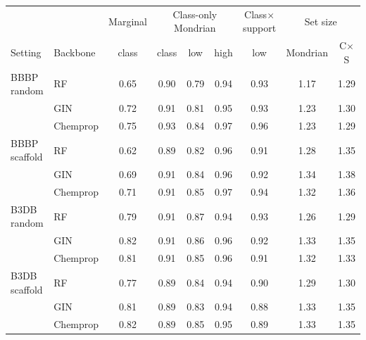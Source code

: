 \begin{tabular}{llccccccc}
\toprule
& & Marginal & \multicolumn{3}{c}{Class-only Mondrian} & Class$\times$support & \multicolumn{2}{c}{Set size}\\
\cmidrule(lr){4-6}\cmidrule(lr){8-9}
Setting & Backbone & class & class & low & high & low & Mondrian & C$\times$S\\
\midrule
BBBP random & RF & 0.65 & 0.90 & 0.79 & 0.94 & 0.93 & 1.17 & 1.29\\
 & GIN & 0.72 & 0.91 & 0.81 & 0.95 & 0.93 & 1.23 & 1.30\\
 & Chemprop & 0.75 & 0.93 & 0.84 & 0.97 & 0.96 & 1.23 & 1.29\\\midrule
BBBP scaffold & RF & 0.62 & 0.89 & 0.82 & 0.96 & 0.91 & 1.28 & 1.35\\
 & GIN & 0.69 & 0.91 & 0.84 & 0.96 & 0.92 & 1.34 & 1.38\\
 & Chemprop & 0.71 & 0.91 & 0.85 & 0.97 & 0.94 & 1.32 & 1.36\\\midrule
B3DB random & RF & 0.79 & 0.91 & 0.87 & 0.94 & 0.93 & 1.26 & 1.29\\
 & GIN & 0.82 & 0.91 & 0.86 & 0.96 & 0.92 & 1.33 & 1.35\\
 & Chemprop & 0.81 & 0.91 & 0.85 & 0.96 & 0.91 & 1.32 & 1.33\\\midrule
B3DB scaffold & RF & 0.77 & 0.89 & 0.84 & 0.94 & 0.90 & 1.29 & 1.30\\
 & GIN & 0.81 & 0.89 & 0.83 & 0.94 & 0.88 & 1.33 & 1.35\\
 & Chemprop & 0.82 & 0.89 & 0.85 & 0.95 & 0.89 & 1.33 & 1.35\\
\bottomrule
\end{tabular}
